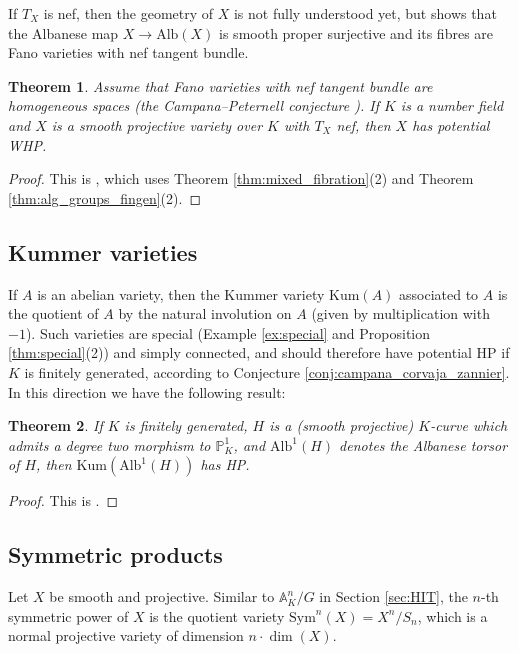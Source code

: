 \documentclass[10pt,a4paper]{amsart}
\theoremstyle{plain}
\newtheorem{theorem}{Theorem}
\theoremstyle{remark}
\numberwithin{theorem}{section}
\begin{document}
If $T_X$ is nef, then the geometry of $X$ is not fully understood yet,
but \cite{DPS} shows that
the Albanese map $X\to \mathrm{Alb}(X)$ is smooth proper surjective and its fibres are Fano varieties with nef tangent bundle.  
     
 \begin{theorem}
     Assume that Fano varieties with nef tangent bundle are homogeneous spaces
     (the Campana--Peternell conjecture \cite[p.~170]{CampanaPeternell}). 
     If $K$ is a number field and $X$ is a smooth projective variety over $K$ with $T_X$ nef, then $X$ has potential WHP.
 \end{theorem}

 \begin{proof}
This is \cite[Theorem 1.8]{Javanpeykar22}, which uses
Theorem \ref{thm:mixed_fibration}(2) and Theorem \ref{thm:alg_groups_fingen}(2).
 \end{proof}

\subsection{Kummer varieties}
\label{sec:Kumvar}

If $A$ is an abelian variety, then the Kummer variety $\mathrm{Kum}(A)$ associated to $A$ is the quotient of $A$ by the natural involution on $A$ (given by multiplication with $-1$). 
Such varieties are special (Example \ref{ex:special} and Proposition \ref{thm:special}(2)) and simply connected, and should therefore have potential HP if $K$ is finitely generated,
according to Conjecture \ref{conj:campana_corvaja_zannier}.
In this direction we have the following result:

\begin{theorem} 
If $K$ is finitely generated,
$H$ is a (smooth projective) $K$-curve which admits a degree two morphism to $\mathbb{P}^1_K$,
and $\mathrm{Alb}^1(H)$ denotes the Albanese torsor of $H$,
then $\mathrm{Kum}(\mathrm{Alb}^1(H))$ has HP.
\end{theorem}

\begin{proof}
This is \cite[Theorem~1.5]{GCH}.     
\end{proof}

\subsection{Symmetric products}   
Let $X$   be smooth and  projective.
Similar to $\mathbb{A}^n_K/G$ in Section \ref{sec:HIT},
the $n$-th symmetric power of $X$ is the quotient variety $\mathrm{Sym}^n(X) = X^n/S_n$, which is 
a normal projective variety of dimension $n\cdot \dim(X)$.
\end{document}
